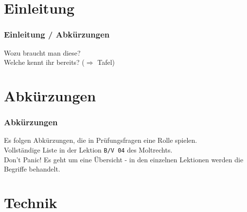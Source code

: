 

\subtitle{Betriebstechnik/Vorschriften 04:         \\
          Betriebliche Abkürzungen \\[2em]}
\date{Stand 06.11.2014}



\section*{Einleitung}

\begin{frame}
    \frametitle{Einleitung / Abkürzungen}
    \begin{center}
        \Large{Wozu braucht man diese?} \\
        \Large{Welche kennt ihr bereits? ($\Rightarrow$ Tafel)}
    \end{center}
\end{frame}

\section*{Abkürzungen}

\begin{frame}
    \frametitle{Abkürzungen}

    Es folgen Abkürzungen, die in Prüfungsfragen eine Rolle spielen. \\[1em]

    Vollständige Liste in der Lektion \texttt{B/V 04} des Moltrechts. \\[1em]

    Don't Panic! Es geht um eine Übersicht - in den einzelnen Lektionen werden
    die Begriffe behandelt.

\end{frame}

\section*{Technik}


